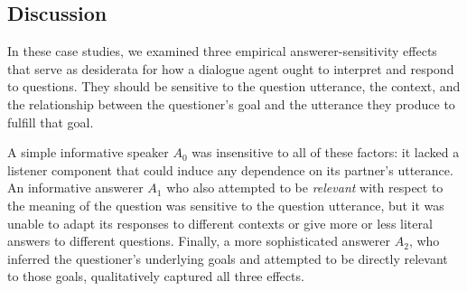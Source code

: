 \documentclass[11pt, floatsintext]{apa6}
\begin{document}

\subsection{Discussion}

In these case studies, we examined three empirical answerer-sensitivity effects that serve as desiderata for how a dialogue agent ought to interpret and respond to questions. 
They should be sensitive to the question utterance, the context, and the relationship between the questioner's goal and the utterance they produce to fulfill that goal.

A simple informative speaker $A_0$ was insensitive to all of these factors: it lacked a listener component that could induce any dependence on its partner's utterance. 
An informative answerer $A_1$ who also attempted to be \emph{relevant} with respect to the meaning of the question was sensitive to the question utterance, but it was unable to adapt its responses to different contexts or give more or less literal answers to different questions. 
Finally, a more sophisticated answerer $A_2$, who inferred the questioner's underlying goals and attempted to be directly relevant to those goals, qualitatively captured all three effects.
\end{document}
